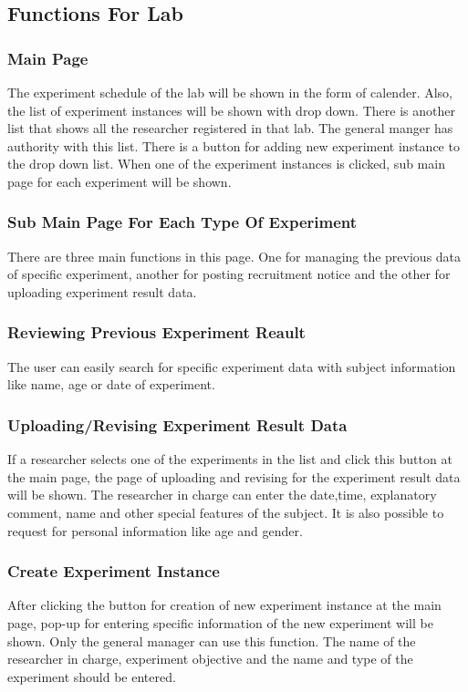 \documentclass[letterpaper, 10 pt, conference]{ieeeconf}  %
\begin{document}
\subsection{Functions For Lab}

\subsubsection{Main Page}
The experiment schedule of the lab will be shown in the form of calender. Also, the list of experiment instances will be shown with drop down. There is another list that shows all the researcher registered in that lab. The general manger has authority with this list. There is a button for adding new experiment instance to the drop down list. When one of the experiment instances is clicked, sub main page for each experiment will be shown. 
\subsubsection{Sub Main Page For Each Type Of Experiment}
There are three main functions in this page. One for managing the previous data of specific experiment, another for posting recruitment notice and the other for uploading experiment result data. 

\subsubsection{Reviewing Previous Experiment Reault }
The user can easily search for specific experiment data with subject information like name, age or date of experiment. 
\subsubsection{Uploading/Revising Experiment Result Data}
If a researcher selects one of the experiments in the list and click this button at the main page, the page of uploading and revising for the experiment result data will be shown. The researcher in charge can enter the date,time, explanatory comment, name and other special features of the subject. It is also possible to request for personal information like age and gender. 
\subsubsection{Create Experiment Instance}
After clicking the button for creation of new experiment instance at the main page, pop-up for entering specific information of the new experiment will be shown. Only the general manager can use this function. The name of the researcher in charge, experiment objective and the name and type of the experiment should be entered. 
\end{document}
